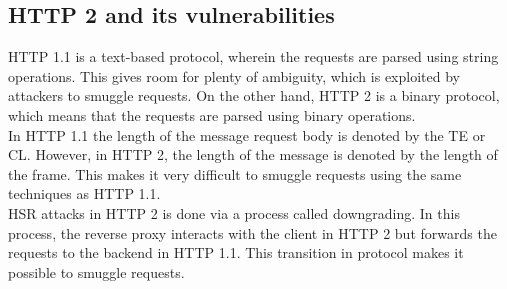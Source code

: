 \documentclass[conference]{IEEEtran}
\begin{document}
\subsection*{HTTP 2 and its vulnerabilities}
HTTP 1.1 is a text-based protocol, wherein the requests are parsed using string operations. This gives room for plenty of ambiguity, which is exploited by attackers to smuggle requests. On the other hand, HTTP 2 is a binary protocol, which means that the requests are parsed using binary operations. \\

In HTTP 1.1 the length of the message request body is denoted by the TE or CL. However, in HTTP 2, the length of the message is denoted by the length of the frame. This makes it very difficult to smuggle requests using the same techniques as HTTP 1.1. \\

HSR attacks in HTTP 2 is done via a process called downgrading. In this process, the reverse proxy interacts with the client in HTTP 2 but forwards the requests to the backend in HTTP 1.1. This transition in protocol makes it possible to smuggle requests. \\
\end{document}
